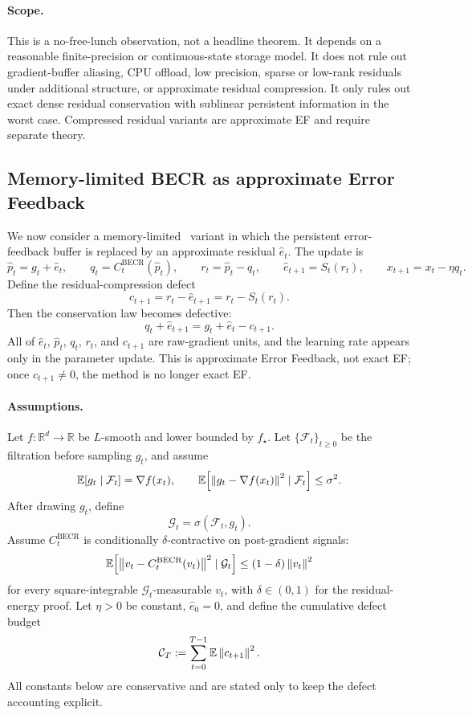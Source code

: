 \paragraph{Scope.}
This is a no-free-lunch observation, not a headline theorem. It depends on a
reasonable finite-precision or continuous-state storage model. It does not
rule out gradient-buffer aliasing, CPU offload, low precision, sparse or
low-rank residuals under additional structure, or approximate residual
compression. It only rules out exact dense residual conservation with
sublinear persistent information in the worst case. Compressed residual
variants are approximate EF and require separate theory.

\subsection{Memory-limited BECR as approximate Error Feedback}
\label{app:compressed-residual-becr}

We now consider a memory-limited \BECR\ variant in which the persistent
error-feedback buffer is replaced by an approximate residual $\hat e_t$. The
update is
\[
\hat p_t = g_t + \hat e_t,\qquad
q_t = C_t^{\mathrm{BECR}}(\hat p_t),\qquad
r_t = \hat p_t - q_t,\qquad
\hat e_{t+1} = S_t(r_t),\qquad
x_{t+1} = x_t - \eta q_t.
\]
Define the residual-compression defect
\[
c_{t+1} = r_t - \hat e_{t+1} = r_t - S_t(r_t).
\]
Then the conservation law becomes defective:
\[
q_t + \hat e_{t+1}
=
g_t + \hat e_t - c_{t+1}.
\]
All of $\hat e_t$, $\hat p_t$, $q_t$, $r_t$, and $c_{t+1}$ are raw-gradient
units, and the learning rate appears only in the parameter update. This is
approximate Error Feedback, not exact EF; once $c_{t+1}\neq 0$, the method is
no longer exact EF.

\paragraph{Assumptions.}
Let $f:\mathbb R^d\to\mathbb R$ be $L$-smooth and lower bounded by $f_\star$.
Let $\{\mathcal F_t\}_{t\ge 0}$ be the filtration before sampling $g_t$, and
assume
\[
\mathbb{E}[g_t\mid \mathcal F_t]=\nabla f(x_t),\qquad
\mathbb{E}\!\left[\left\lVert g_t-\nabla f(x_t) \right\rVert^2\mid \mathcal F_t\right]\le \sigma^2.
\]
After drawing $g_t$, define
\[
\mathcal G_t = \sigma(\mathcal F_t,g_t).
\]
Assume $C_t^{\mathrm{BECR}}$ is conditionally $\delta$-contractive on
post-gradient signals:
\[
\mathbb{E}\!\left[\left\lVert v_t-C_t^{\mathrm{BECR}}(v_t) \right\rVert^2\mid \mathcal G_t\right]
\le (1-\delta)\left\lVert v_t \right\rVert^2
\]
for every square-integrable $\mathcal G_t$-measurable $v_t$, with
$\delta\in(0,1)$ for the residual-energy proof. Let $\eta>0$ be constant,
$\hat e_0=0$, and define the cumulative defect budget
\[
\mathcal C_T := \sum_{t=0}^{T-1}\mathbb{E}\left\lVert c_{t+1} \right\rVert^2.
\]
All constants below are conservative and are stated only to keep the defect
accounting explicit.

